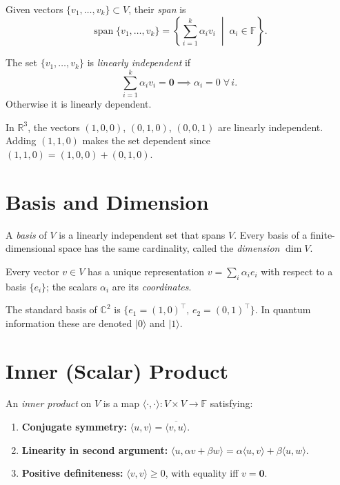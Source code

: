 Given vectors $\{v_1,\ldots,v_k\}\subset V$, their \emph{span} is
\[
  \operatorname{span}\{v_1,\ldots,v_k\} = \left\{\sum_{i=1}^k \alpha_i v_i \;\middle|\; \alpha_i\in\mathbb{F}\right\}.
\]

The set $\{v_1,\ldots,v_k\}$ is \emph{linearly independent} if
\[
  \sum_{i=1}^k \alpha_i v_i = \mathbf{0} \implies \alpha_i = 0 \;\forall\, i.
\]
Otherwise it is linearly dependent.

\begin{example}
In $\mathbb{R}^3$, the vectors $(1,0,0)$, $(0,1,0)$, $(0,0,1)$ are linearly independent. Adding $(1,1,0)$ makes the set dependent since $(1,1,0)=(1,0,0)+(0,1,0)$.
\end{example}

\section{Basis and Dimension}

A \emph{basis} of $V$ is a linearly independent set that spans $V$. Every basis of a finite-dimensional space has the same cardinality, called the \emph{dimension} $\dim V$.

Every vector $v\in V$ has a unique representation $v = \sum_i \alpha_i e_i$ with respect to a basis $\{e_i\}$; the scalars $\alpha_i$ are its \emph{coordinates}.

\begin{example}
The standard basis of $\mathbb{C}^2$ is $\{e_1=(1,0)^\top,\, e_2=(0,1)^\top\}$. In quantum information these are denoted $|0\rangle$ and $|1\rangle$.
\end{example}

\section{Inner (Scalar) Product}

An \emph{inner product} on $V$ is a map $\langle\cdot,\cdot\rangle: V\times V\to\mathbb{F}$ satisfying:
\begin{enumerate}
  \item \textbf{Conjugate symmetry:} $\langle u,v\rangle = \overline{\langle v,u\rangle}$.
  \item \textbf{Linearity in second argument:} $\langle u,\alpha v+\beta w\rangle = \alpha\langle u,v\rangle+\beta\langle u,w\rangle$.
  \item \textbf{Positive definiteness:} $\langle v,v\rangle \geq 0$, with equality iff $v=\mathbf{0}$.
\end{enumerate}

